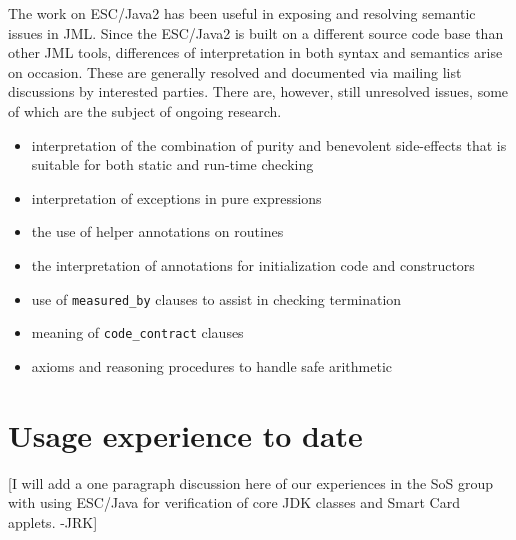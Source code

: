 \documentclass{acm_proc_article-sp}
\begin{document}
The work on ESC/Java2 has been useful in exposing and resolving
semantic issues in JML.  Since the ESC/Java2 is built on a different
source code base than other JML tools, differences of interpretation
in both syntax and semantics arise on occasion.  These are generally
resolved and documented via mailing list discussions by interested
parties.  There are, however, still unresolved issues, some of which
are the subject of ongoing research.
\setlength{\partopsep}{0in}\setlength{\parskip}{0in}
\begin{itemize}\setlength{\itemsep}{0in}
\item interpretation of the combination of purity and benevolent
  side-effects that is suitable for both static and run-time checking
\item interpretation of exceptions in pure expressions
\item the use of helper annotations on routines
\item the interpretation of annotations for initialization code and
  constructors
\item use of {\tt measured\_by} clauses to assist in checking
  termination
\item meaning of {\tt code\_contract} clauses
\item axioms and reasoning procedures to handle safe
  arithmetic~\cite{Chalin03}
\end{itemize}

\section{Usage experience to date}
[I will add a one paragraph discussion here of our experiences in
the SoS group with using ESC/Java for verification of core JDK classes
and Smart Card applets. -JRK]
\end{document}
